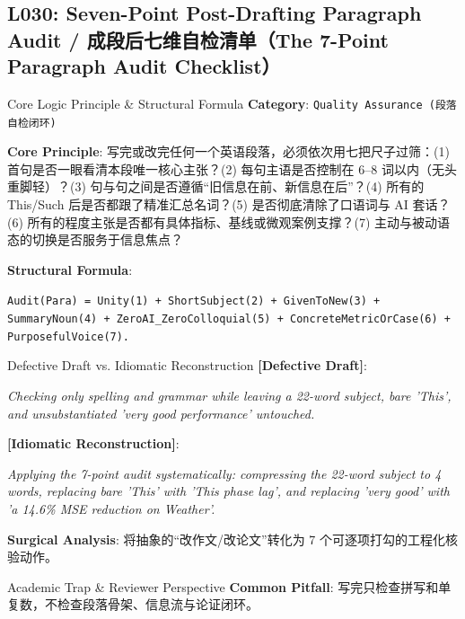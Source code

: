 \subsection{L030: Seven-Point Post-Drafting Paragraph Audit / 成段后七维自检清单（The 7-Point Paragraph Audit Checklist）}\label{sec:logic:L030}
\begin{ConceptBox}{Core Logic Principle \& Structural Formula}
\textbf{Category}: \texttt{Quality Assurance (段落自检闭环)}\par\vspace{3pt}
\textbf{Core Principle}: 写完或改完任何一个英语段落，必须依次用七把尺子过筛：(1)  首句是否一眼看清本段唯一核心主张？(2)  每句主语是否控制在 6--8 词以内（无头重脚轻）？(3)  句与句之间是否遵循“旧信息在前、新信息在后”？(4)  所有的 This/Such 后是否都跟了精准汇总名词？(5)  是否彻底清除了口语词与 AI 套话？(6)  所有的程度主张是否都有具体指标、基线或微观案例支撑？(7)  主动与被动语态的切换是否服务于信息焦点？\par\vspace{4pt}
\textbf{Structural Formula}:\par\noindent\texttt{Audit(Para) = Unity(1) + ShortSubject(2) + GivenToNew(3) + SummaryNoun(4) + ZeroAI\_ZeroColloquial(5) + ConcreteMetricOrCase(6) + PurposefulVoice(7).}
\end{ConceptBox}
\begin{ExampleBox}{Defective Draft vs. Idiomatic Reconstruction}
\textbf{\color{TargetHighlight}[Defective Draft]}:\par\textit{Checking only spelling and grammar while leaving a 22-word subject, bare 'This', and unsubstantiated 'very good performance' untouched.}\par\vspace{4pt}
\textbf{\color{AcadNavy}[Idiomatic Reconstruction]}:\par\textit{Applying the 7-point audit systematically: compressing the 22-word subject to 4 words, replacing bare 'This' with 'This phase lag', and replacing 'very good' with 'a 14.6\% MSE reduction on Weather'.}\par\vspace{4pt}
\textbf{Surgical Analysis}: 将抽象的“改作文/改论文”转化为 7 个可逐项打勾的工程化核验动作。
\end{ExampleBox}
\begin{TipBox}{Academic Trap \& Reviewer Perspective}
\textbf{Common Pitfall}: 写完只检查拼写和单复数，不检查段落骨架、信息流与论证闭环。
\end{TipBox}
\vspace{6pt}